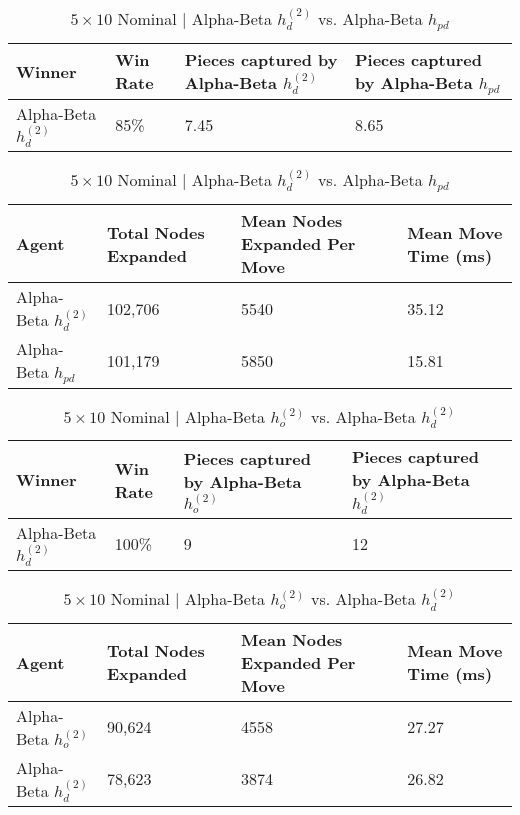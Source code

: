 \documentclass{article}[12pt]
\begin{document}
\begin{table}[ht]
	\centering
	\begin{tabular}{l | l | l | l}
		\hline
		Winner & Win Rate & Pieces captured by Alpha-Beta $h_{d}^{(2)}$ & Pieces captured by Alpha-Beta $h_{pd}$ \\
		\hline \hline 
		Alpha-Beta $h_{d}^{(2)}$ & 85\% & 7.45 & 8.65 \\
		\hline
	\end{tabular}
	
	\vspace{10px}
	
	\begin{tabular}{l | l | l | l}
		\hline
		Agent & Total Nodes Expanded & Mean Nodes Expanded Per Move & Mean Move Time (ms) \\
		\hline \hline 
		Alpha-Beta $h_{d}^{(2)}$  & 102,706 & 5540 & 35.12 \\
		Alpha-Beta $h_{pd}$ & 101,179 & 5850 & 15.81\\
		\hline
	\end{tabular}
	\caption{$5 \times 10$ Nominal | Alpha-Beta $h_{d}^{(2)}$ vs. Alpha-Beta $h_{pd}$} \label{tab:t25}
\end{table}


\begin{table}[ht]
	\centering
	\begin{tabular}{l | l | l | l}
		\hline
		Winner & Win Rate & Pieces captured by Alpha-Beta $h_{o}^{(2)}$ & Pieces captured by Alpha-Beta $h_{d}^{(2)}$ \\
		\hline \hline 
		Alpha-Beta $h_{d}^{(2)}$ & 100\% & 9 & 12 \\
		\hline
	\end{tabular}
	
	\vspace{10px}
	
	\begin{tabular}{l | l | l | l}
		\hline
		Agent & Total Nodes Expanded & Mean Nodes Expanded Per Move & Mean Move Time (ms) \\
		\hline \hline 
		Alpha-Beta $h_{o}^{(2)}$  & 90,624 & 4558 & 27.27 \\
		Alpha-Beta $h_{d}^{(2)}$ & 78,623 & 3874 & 26.82\\
		\hline
	\end{tabular}
	\caption{$5 \times 10$ Nominal | Alpha-Beta $h_{o}^{(2)}$ vs. Alpha-Beta $h_{d}^{(2)}$} \label{tab:t26}
\end{table}
\end{document}
